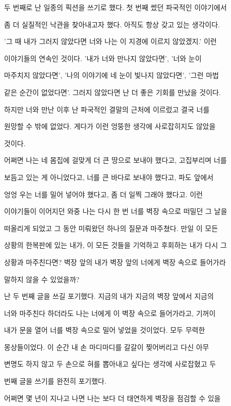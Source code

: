 두 번째로 난 일종의 픽션을 쓰기로 했다. 첫 번째 썼던 파국적인 이야기에서

좀 더 실질적인 낙관을 찾아내고자 했다. 아직도 항상 갖고 있는 생각이다.

'그 때 내가 그러지 않았다면 너와 나는 이 지경에 이르지 않았겠지.' 이런

이야기들의 연속인 것이다. '내가 너와 만나지 않았다면', '너와 눈이

마주치지 않았다면', '나의 이야기에 네 눈이 빛나지 않았다면', '그런 마법

같은 순간이 없었다면'. 그러지 않았다면 난 더 좋은 기회를 만났을 것이다.

하지만 너와 만난 이후 난 파국적인 결말의 근처에 이르렀고 결국 너를

원망할 수 밖에 없었다. 게다가 이런 엉뚱한 생각에 사로잡히지도 않았을

것이다.



어쩌면 나는 네 몸집에 걸맞게 더 큰 땅으로 보내야 했다고, 고집부리며 너를

보듬고 있는 게 아니었다고, 너를 큰 바다로 보내야 했다고, 파도 앞에서

엉엉 우는 너를 밀어 넣어야 했다고, 좀 더 일찍 그래야 했다고. 이런

이야기들이 이어지던 와중 나는 다시 한 번 너를 벽장 속으로 떠밀던 그 날을

떠올리게 되었고 그 동안 미뤄왔던 하나의 질문과 마주쳤다. 만일 이 모든

상황의 한복판에 있는 내가, 이 모든 것들을 기억하고 후회하는 내가 다시 그

상황과 마주친다면? 벽장 앞의 내가 벽장 앞의 너에게 벽장 속으로 들어가라

말하지 않을 수 있었을까?



난 두 번째 글을 쓰길 포기했다. 지금의 내가 지금의 벽장 앞에서 지금의

너와 마주친다 하더라도 나는 너에게 이 벽장 속으로 들어가라고, 기꺼이

내가 문을 열어 너를 벽장 속으로 밀어 넣었을 것이었다. 모두 무력한

몽상들이었다. 이 순간 내 손 마디마디를 갈갈이 찢어버리고 다신 아무

변명도 하지 않고 두 손으로 혀를 뽑아내고 싶다는 생각에 사로잡혔고 두

번째 글을 쓰기를 완전히 포기했다.



어쩌면 몇 년이 지나고 나면 나는 보다 더 태연하게 벽장을 점검할 수 있을

